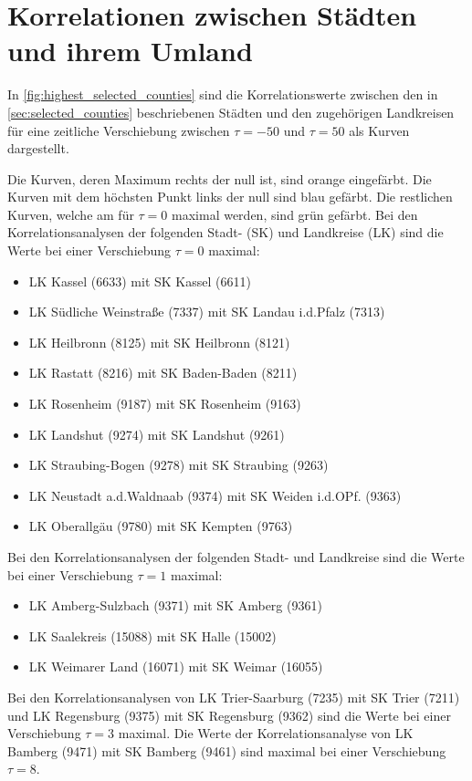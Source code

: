 \section{Korrelationen zwischen Städten und ihrem Umland}
In \autoref{fig:highest_selected_counties} sind die Korrelationswerte zwischen den in  \autoref{sec:selected_counties} beschriebenen Städten und den zugehörigen Landkreisen für eine zeitliche Verschiebung zwischen $\tau=-50$ und $\tau=50$ als Kurven dargestellt.

Die Kurven, deren Maximum rechts der null ist, sind orange eingefärbt. Die Kurven mit dem höchsten Punkt links der null sind blau gefärbt. Die restlichen Kurven, welche am für $\tau=0$ maximal werden, sind grün gefärbt.
Bei den Korrelationsanalysen der folgenden Stadt- (SK) und Landkreise (LK) sind die Werte bei einer Verschiebung $\tau=0$ maximal:
\begin{itemize}
    \item LK Kassel (6633) mit SK Kassel (6611)
    \item LK Südliche Weinstraße (7337) mit SK Landau i.d.Pfalz (7313)
    \item LK Heilbronn (8125) mit SK Heilbronn (8121)
    \item LK Rastatt (8216) mit SK Baden-Baden (8211)
    \item LK Rosenheim (9187) mit SK Rosenheim (9163)
    \item LK Landshut (9274) mit SK Landshut (9261)
    \item LK Straubing-Bogen (9278) mit SK Straubing (9263)
    \item LK Neustadt a.d.Waldnaab (9374) mit SK Weiden i.d.OPf. (9363)
    \item LK Oberallgäu (9780) mit SK Kempten (9763)
\end{itemize}
Bei den Korrelationsanalysen der folgenden Stadt- und Landkreise sind die Werte bei einer Verschiebung $\tau=1$ maximal:
\begin{itemize}
    \item LK Amberg-Sulzbach (9371) mit SK Amberg (9361)
    \item LK Saalekreis (15088) mit SK Halle (15002)
    \item LK Weimarer Land (16071) mit SK Weimar (16055)
\end{itemize}
Bei den Korrelationsanalysen von LK Trier-Saarburg (7235) mit SK Trier (7211) und LK Regensburg (9375) mit SK Regensburg (9362) sind die Werte bei einer Verschiebung $\tau=3$ maximal. Die Werte der Korrelationsanalyse von LK Bamberg (9471) mit SK Bamberg (9461) sind maximal bei einer Verschiebung $\tau=8$.
